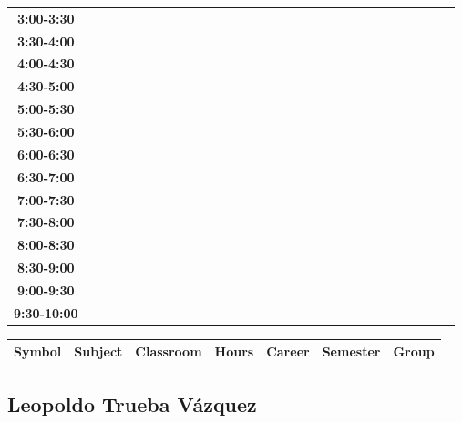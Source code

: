 \documentclass{article}
\begin{document}
\begin{table}[ht]
\begin{tabular}{|c|c|c|c|c|c|c|c|c|c|c|c|c|c|c|c|c|c|c|c|c|c|c|c|c|c|c|c|c|c|}
\textbf{3:00-3:30} &   &   &   &   &   &   &   \\
 \cline{1-8} 
\textbf{3:30-4:00} &   &   &   &   &   &   &   \\
 \cline{1-8} 
\textbf{4:00-4:30} &   &   &   &   &   &   &   \\
 \cline{1-8} 
\textbf{4:30-5:00} &   &   &   &   &   &   &   \\
 \cline{1-8} 
\textbf{5:00-5:30} &   &   &   &   &   &   &   \\
 \cline{1-8} 
\textbf{5:30-6:00} &   &   &   &   &   &   &   \\
 \cline{1-8} 
\textbf{6:00-6:30} &   &   &   &   &   &   &   \\
 \cline{1-8} 
\textbf{6:30-7:00} &   &   &   &   &   &   &   \\
 \cline{1-8} 
\textbf{7:00-7:30} &   &   &   &   &   &   &   \\
 \cline{1-8} 
\textbf{7:30-8:00} &   &   &   &   &   &   &   \\
 \cline{1-8} 
\textbf{8:00-8:30} &   &   &   &   &   &   &   \\
 \cline{1-8} 
\textbf{8:30-9:00} &   &   &   &   &   &   &   \\
 \cline{1-8} 
\textbf{9:00-9:30} &   &   &   &   &   &   &   \\
 \cline{1-8} 
\textbf{9:30-10:00} &   &   &   &   &   &   &   \\
 \cline{1-8} 
\end{tabular}\end{table}

        
        \begin{tabular}{|>{\centering\arraybackslash}m{2cm}|>{\centering\arraybackslash}m{4cm}|>{\centering\arraybackslash}m{2cm}|>{\centering\arraybackslash}m{2cm}|>{\centering\arraybackslash}m{2cm}|>{\centering\arraybackslash}m{2cm}|>{\centering\arraybackslash}m{2cm}|}
        \hline
        \textbf{Symbol} & \textbf{Subject} & \textbf{Classroom} & \textbf{Hours} & \textbf{Career} & \textbf{Semester} & \textbf{Group} \\
        \hline
        \end{tabular}
                    

        \newpage
        

        \subsection{Leopoldo Trueba V\'azquez}
        \vspace*{.1cm}
        
\end{document}
